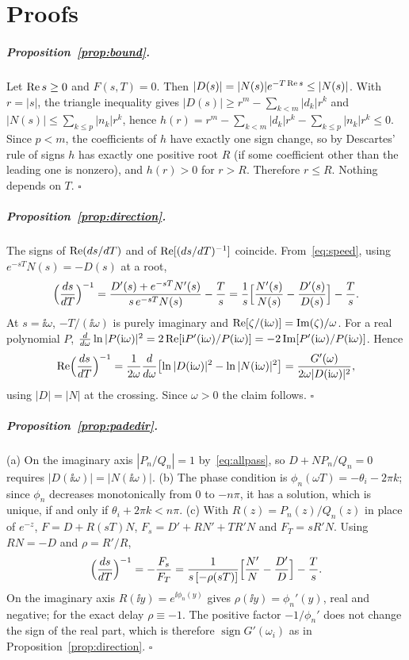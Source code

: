 \chapter{Proofs}\label{ap:proofs}

\paragraph{Proposition~\ref{prop:bound}.} Let $\operatorname{Re} s\ge0$ and $F(s,T)=0$.
Then $|D(s)|=|N(s)|e^{-T\operatorname{Re} s}\le|N(s)|$. With $r=|s|$, the triangle
inequality gives $|D(s)|\ge r^m-\sum_{k<m}|d_k|r^k$ and
$|N(s)|\le\sum_{k\le p}|n_k|r^k$, hence
$h(r)=r^m-\sum_{k<m}|d_k|r^k-\sum_{k\le p}|n_k|r^k\le0$. Since $p<m$, the
coefficients of $h$ have exactly one sign change, so by Descartes' rule of
signs $h$ has exactly one positive root $R$ (if some coefficient other than
the leading one is nonzero), and $h(r)>0$ for $r>R$. Therefore $r\le R$.
Nothing depends on $T$. \hfill$\square$

\paragraph{Proposition~\ref{prop:direction}.} The signs of $\operatorname{Re}(ds/dT)$ and
of $\operatorname{Re}[(ds/dT)^{-1}]$ coincide. From~\eqref{eq:speed}, using
$e^{-sT}N(s)=-D(s)$ at a root,
\[
  \Bigl(\frac{ds}{dT}\Bigr)^{-1}=\frac{D'(s)+e^{-sT}N'(s)}{s\,e^{-sT}N(s)}-\frac Ts
  =\frac1s\Bigl[\frac{N'(s)}{N(s)}-\frac{D'(s)}{D(s)}\Bigr]-\frac Ts .
\]
At $s=\ii\omega$, $-T/(\ii\omega)$ is purely imaginary and
$\operatorname{Re}[\zeta/(\mathrm{i}\omega)]=\operatorname{Im}(\zeta)/\omega$. For a real polynomial $P$,
$\frac{d}{d\omega}\ln|P(\mathrm{i}\omega)|^2=2\operatorname{Re}[\mathrm{i} P'(\mathrm{i}\omega)/P(\mathrm{i}\omega)]
=-2\operatorname{Im}[P'(\mathrm{i}\omega)/P(\mathrm{i}\omega)]$. Hence
\[
  \operatorname{Re}\Bigl(\frac{ds}{dT}\Bigr)^{-1}
  =\frac{1}{2\omega}\frac{d}{d\omega}\bigl[\ln|D(\mathrm{i}\omega)|^2-\ln|N(\mathrm{i}\omega)|^2\bigr]
  =\frac{G'(\omega)}{2\omega|D(\mathrm{i}\omega)|^2},
\]
using $|D|=|N|$ at the crossing. Since $\omega>0$ the claim follows.
\hfill$\square$

\paragraph{Proposition~\ref{prop:padedir}.} (a) On the imaginary axis
$|P_n/Q_n|=1$ by~\eqref{eq:allpass}, so $D+NP_n/Q_n=0$ requires
$|D(\ii\omega)|=|N(\ii\omega)|$. (b) The phase condition is
$\phi_n(\omega T)=-\theta_i-2\pi k$; since $\phi_n$ decreases monotonically
from $0$ to $-n\pi$, it has a solution, which is unique, if and only if
$\theta_i+2\pi k<n\pi$. (c) With $R(z)=P_n(z)/Q_n(z)$ in place of $e^{-z}$,
$F=D+R(sT)N$, $F_s=D'+RN'+TR'N$ and $F_T=sR'N$. Using $RN=-D$ and
$\rho=R'/R$,
\[
  \Bigl(\frac{ds}{dT}\Bigr)^{-1}=-\frac{F_s}{F_T}
  =\frac{1}{s\,[-\rho(sT)]}\Bigl[\frac{N'}{N}-\frac{D'}{D}\Bigr]-\frac Ts .
\]
On the imaginary axis $R(\ii y)=e^{\ii\phi_n(y)}$ gives
$\rho(\ii y)=\phi_n'(y)$, real and negative; for the exact delay
$\rho\equiv-1$. The positive factor $-1/\phi_n'$ does not change the sign of
the real part, which is therefore $\operatorname{sign}G'(\omega_i)$ as in
Proposition~\ref{prop:direction}. \hfill$\square$

